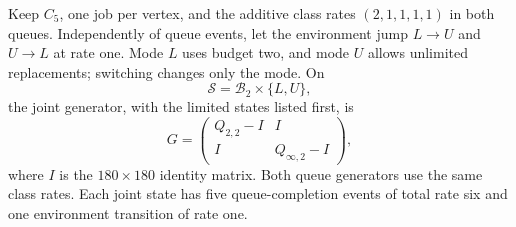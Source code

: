 \documentclass[11pt]{article}
\theoremstyle{remark}
\begin{document}
Keep $C_5$, one job per vertex, and the additive class rates $(2,1,1,1,1)$ in both queues. Independently of queue events, let the environment jump $L\to U$ and $U\to L$ at rate one. Mode $L$ uses budget two, and mode $U$ allows unlimited replacements; switching changes only the mode. On
\[
 \mathcal S=\mathcal B_2\times\{L,U\},
\]
the joint generator, with the limited states listed first, is
\begin{equation}\label{eq:modulated-generator}
 G=\begin{pmatrix}Q_{2,2}-I&I\\I&Q_{\infty,2}-I\end{pmatrix},
\end{equation}
where $I$ is the $180\times180$ identity matrix. Both queue generators use the same class rates. Each joint state has five queue-completion events of total rate six and one environment transition of rate one.
\end{document}
